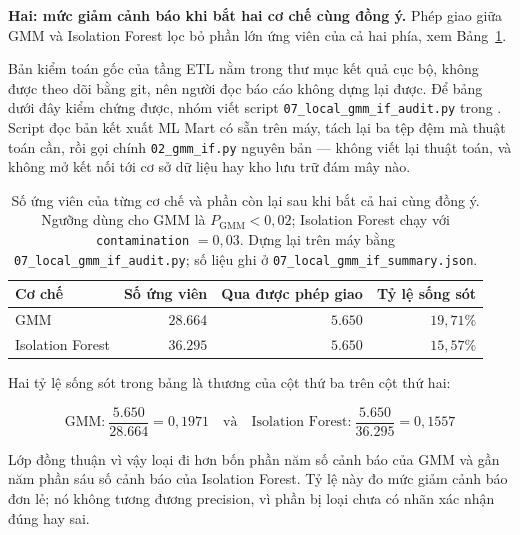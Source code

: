 \documentclass[12pt, a4paper]{report}
\begin{document}
\textbf{Hai: mức giảm cảnh báo khi bắt hai cơ chế cùng đồng ý.} Phép giao giữa GMM và
Isolation Forest lọc bỏ phần lớn ứng viên của cả hai phía, xem Bảng~\ref{tab:song_sot_and}.

Bản kiểm toán gốc của tầng ETL nằm trong thư mục kết quả cục bộ, không được theo dõi bằng
git, nên người đọc báo cáo không dựng lại được. Để bảng dưới đây kiểm chứng được, nhóm viết
script \texttt{07\_local\_gmm\_if\_audit.py} trong .
Script đọc bản kết xuất ML Mart có sẵn trên máy, tách lại ba tệp đệm mà thuật toán cần, rồi
gọi chính \texttt{02\_gmm\_if.py} nguyên bản --- không viết lại thuật toán, và không mở kết nối
tới cơ sở dữ liệu hay kho lưu trữ đám mây nào.

\begin{table}[htbp]
\centering
\caption{Số ứng viên của từng cơ chế và phần còn lại sau khi bắt cả hai cùng đồng ý. Ngưỡng
dùng cho GMM là $P_{\text{GMM}} < 0{,}02$; Isolation Forest chạy với
\texttt{contamination} $= 0{,}03$. Dựng lại trên máy bằng
\texttt{07\_local\_gmm\_if\_audit.py}; số liệu ghi ở \texttt{07\_local\_gmm\_if\_summary.json}.}
\label{tab:song_sot_and}
\small
\begin{tabular}{l r r r}
\toprule
\textbf{Cơ chế} & \textbf{Số ứng viên} & \textbf{Qua được phép giao} & \textbf{Tỷ lệ sống sót} \\
\midrule
GMM              & $28.664$ & $5.650$ & $19{,}71\%$ \\
Isolation Forest & $36.295$ & $5.650$ & $15{,}57\%$ \\
\bottomrule
\end{tabular}
\caption[Số ứng viên của từng cơ chế và phần còn lại sau khi bắt cả hai cùng đồng ý]{Số ứng viên của từng cơ chế và phần còn lại sau khi bắt cả hai cùng đồng ý. Ngưỡng
dùng cho GMM là $P_{\text{GMM}} < 0{,}02$; Isolation Forest chạy với
\texttt{contamination} $= 0{,}03$. Dựng lại trên máy bằng
\texttt{07\_local\_gmm\_if\_audit.py}; số liệu ghi ở \texttt{07\_local\_gmm\_if\_summary.json}.}
\label{tab:song_sot_and}
\end{table}

Hai tỷ lệ sống sót trong bảng là thương của cột thứ ba trên cột thứ hai:

\begin{equation}
\text{GMM:}\ \frac{5.650}{28.664} = 0{,}1971 \quad\text{và}\quad
\text{Isolation Forest:}\ \frac{5.650}{36.295} = 0{,}1557
\end{equation}

Lớp đồng thuận vì vậy loại đi hơn bốn phần năm số cảnh báo của GMM và gần năm phần sáu số
cảnh báo của Isolation Forest. Tỷ lệ này đo mức giảm cảnh báo đơn lẻ; nó không tương
đương precision, vì phần bị loại chưa có nhãn xác nhận đúng hay sai.
\end{document}
